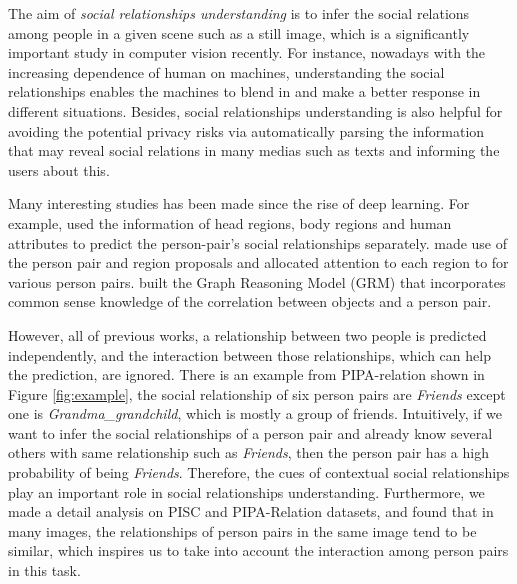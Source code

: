 \documentclass{article}
\begin{document}
The aim of \emph{social relationships understanding} is to infer the social relations among people in a given scene such as a still image, which is a significantly important study in computer vision recently. For instance, nowadays with the increasing dependence of human on machines, understanding the social relationships enables the machines to blend in and make a better response in different situations. Besides, social relationships understanding is also helpful for avoiding the potential privacy risks via automatically parsing the information that may reveal social relations in many medias such as texts \cite{article} and informing the users about this. 

Many interesting studies has been made since the rise of deep learning. For example, \cite{DBLP:conf/cvpr/SunSF17} used the information of head regions, body regions and human attributes to predict the person-pair's social relationships separately. \cite{DBLP:conf/iccv/LiWZK17} made use of the person pair and region proposals and allocated attention to each region to for various person pairs. \cite{DBLP:conf/ijcai/WangCRYCL18} built the Graph Reasoning Model (GRM) that incorporates common sense knowledge of the correlation between objects and a person pair.

However, all of previous works, a relationship between two people is predicted independently, and the interaction between those relationships, which can help the prediction, are ignored.
There is an example from PIPA-relation \cite{DBLP:conf/cvpr/SunSF17} shown in Figure \ref{fig:example}, the social relationship of six person pairs are {\it Friends} except one is {\it Grandma\_grandchild}, which is mostly a group of friends. Intuitively, if we want to infer the social relationships of a person pair and already know several others with same relationship such as {\it Friends}, then the person pair has a high probability of being {\it Friends}. Therefore, the cues of contextual social relationships play an important role in social relationships understanding.
Furthermore, we made a detail analysis on PISC and PIPA-Relation datasets, and found that
in many images, the relationships of person pairs in the same image tend to be similar, which inspires us to take into account the interaction among person pairs in this task.
\end{document}
